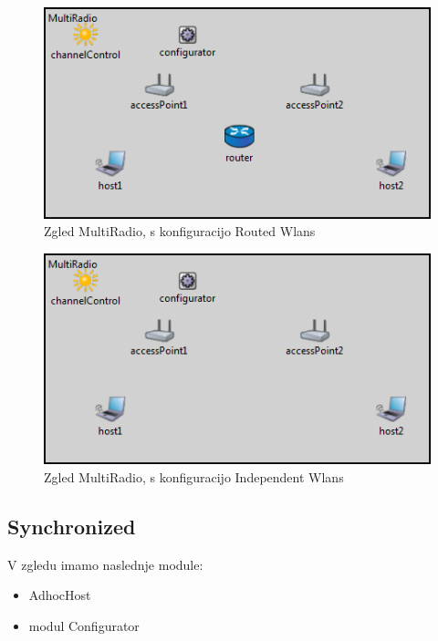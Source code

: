 \documentclass[a4paper,11pt]{article}
\begin{document}
\begin{figure}[htbp]
    \begin{center}
        \includegraphics[scale=0.8]{img/zgledi/multiradio_routed.png}
        \caption{Zgled MultiRadio, s konfiguracijo Routed Wlans}
        \label{image:multiradiorouted}
    \end{center}
\end{figure}

\begin{figure}[htbp]
    \begin{center}
        \includegraphics[scale=0.8]{img/zgledi/multiradio_independent.png}
        \caption{Zgled MultiRadio, s konfiguracijo Independent Wlans}
	\label{image:multiradioindependent}
    \end{center}
\end{figure}


\subsection{Synchronized}

V zgledu imamo naslednje module:
\begin{itemize}
    \item AdhocHost
    \item modul Configurator
\end{itemize}
\end{document}
